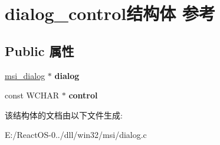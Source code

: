 \hypertarget{structdialog__control}{}\section{dialog\+\_\+control结构体 参考}
\label{structdialog__control}
\subsection*{Public 属性}
\begin{DoxyCompactItemize}
\item 
\mbox{\label{structdialog__control_aca13376759140cc5edfee91bd2fe88ea}} 
\hyperlink{structmsi__dialog__tag}{msi\+\_\+dialog} $\ast$ {\bfseries dialog}
\item 
\mbox{\label{structdialog__control_a02b337e289c2f7843b1b6c3c8babb08f}} 
const W\+C\+H\+AR $\ast$ {\bfseries control}
\end{DoxyCompactItemize}


该结构体的文档由以下文件生成\+:\begin{DoxyCompactItemize}
\item 
E\+:/\+React\+O\+S-\/0../dll/win32/msi/dialog.\+c\end{DoxyCompactItemize}
